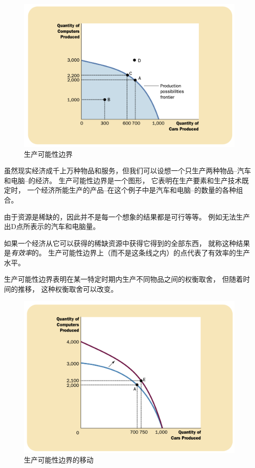 \begin{figure}[!ht]
  \centering
  \includegraphics[width=\textwidth]{pics/the-production-possibilities-frontier}
  \caption{生产可能性边界}
  \label{fig:the-production-possibilities-frontier}
\end{figure}


虽然现实经济成千上万种物品和服务，但我们可以设想一个只生产两种物品--汽车和电脑--的经济。
生产可能性边界是一个图形，
它表明在生产要素和生产技术既定时，
一个经济所能生产的产品--在这个例子中是汽车和电脑--的数量的各种组合。


由于资源是稀缺的，因此并不是每一个想象的结果都是可行等等。
例如无法生产出D点所表示的汽车和电脑量。


如果一个经济从它可以获得的稀缺资源中获得它得到的全部东西，
就称这种结果是\emph{有效率}的。
生产可能性边界上（而不是这条线之内）的点代表了有效率的生产水平。

生产可能性边界表明在某一特定时期内生产不同物品之间的权衡取舍，
但随着时间的推移，
这种权衡取舍可以改变。

\begin{figure}[!ht]
  \centering
  \includegraphics[width=\textwidth]{pics/a-shift-in-the-production-possibilities-frontier}
  \caption{生产可能性边界的移动}
  \label{fig:a-shift-in-the-production-possibilities-frontier}
\end{figure}


